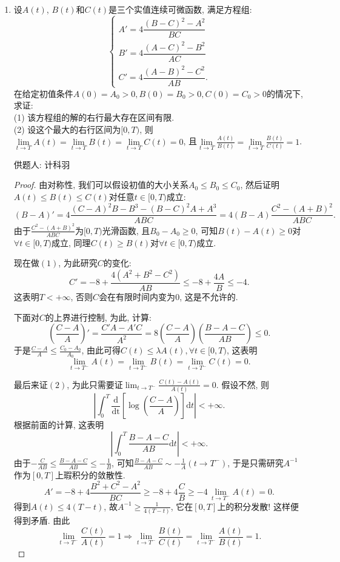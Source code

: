 \documentclass[lang=cn,12pt,a4paper]{elegantpaper.cls}
\begin{document}
\begin{enumerate}
\begin{proof}
		
		
	\end{proof}
	
	\item 
设$A(t)$, $B(t)$和$C(t)$是三个实值连续可微函数, 满足方程组:
$$
\begin{cases}
	A'=4\dfrac{(B-C)^2-A^2}{BC}\\
	B'=4\dfrac{(A-C)^2-B^2}{AC}\\
	C'=4\dfrac{(A-B)^2-C^2}{AB}.
\end{cases}
$$
在给定初值条件$A(0)=A_0>0, B(0)=B_0>0, C(0)=C_0>0$的情况下, 求证:\\
(1) 该方程组的解的右行最大存在区间有限.\\
(2) 设这个最大的右行区间为$[0,T)$, 则$\lim\limits_{t\to T}A(t)=\lim\limits_{t\to T}B(t)=\lim\limits_{t\to T}C(t)=0$, 且$\lim\limits_{t\to T}\frac{A(t)}{B(t)}=\lim\limits_{t\to T}\frac{B(t)}{C(t)}=1$.
\begin{flushright}
	\kaishu
	供题人: 计科羽
\end{flushright}
\begin{proof}
由对称性, 我们可以假设初值的大小关系$A_0\leq B_0\leq C_0$, 然后证明$A(t)\leq B(t)\leq C(t)$对任意$t\in [0,T)$成立:
\[(B-A)'=4\frac{(C-A)^2B-B^3-(B-C)^2A+A^3}{ABC}=4(B-A)\frac{C^2-(A+B)^2}{ABC}.\]
由于$\frac{C^2-(A+B)^2}{ABC}$为$[0,T)$光滑函数, 且$B_0-A_0\geq 0$, 可知$B(t)-A(t)\geq 0$对$\forall t\in[0,T)$成立, 同理$C(t)\geq B(t)$对$\forall t\in[0,T)$成立.

现在做$(1)$, 为此研究$C$的变化: 
\[C'=-8+\frac{4(A^2+B^2-C^2)}{AB}\leq -8+\frac{4A}{B}\leq -4.\]
这表明$T<+\infty$, 否则$C$会在有限时间内变为$0$, 这是不允许的.

下面对$C$的上界进行控制, 为此, 计算:
\[\left(\frac{C-A}{A}\right)'=\frac{C'A-A'C}{A^2}=8\left(\frac{C-A}{A}\right)\left(\frac{B-A-C}{AB}\right)\leq 0.\]
于是$\frac{C-A}{A}\leq \frac{C_0-A_0}{A_0}$, 由此可得$C(t)\leq \lambda A(t),\forall t\in [0,T)$, 这表明
\[\lim_{t\rightarrow T^- }A(t)=\lim_{t\rightarrow T^- }B(t)=\lim_{t\rightarrow T^- }C(t)=0.\]

最后来证$(2)$, 为此只需要证$\displaystyle\lim_{t\rightarrow T^-}\frac{C(t)-A(t)}{A(t)}=0$. 假设不然, 则\[\left|\int_{0}^T\frac{\mathrm{d}}{\mathrm{dt}}\left[\log\left(\frac{C-A}{A}\right)\right] \mathrm{d}t\right|<+\infty.\]
根据前面的计算, 这表明
\[\left|\int_0^T\frac{B-A-C}{AB}\mathrm{d}t\right|<+\infty.\]
由于$-\frac{C}{AB}\leq \frac{B-A-C}{AB}\leq -\frac{1}{B}$, 可知$\frac{B-A-C}{AB}\sim -\frac{1}{A}(t\rightarrow T^-)$, 于是只需研究$A^{-1}$作为$[0,T]$上瑕积分的敛散性.
\[A'=-8+4\frac{B^2+C^2-A^2}{BC}\geq -8+4\frac{C}{B}\geq -4\,\lim_{t\rightarrow T^-}A(t)=0.\]
得到$A(t)\leq 4(T-t)$, 故$A^{-1}\geq \frac{1}{4(T-t)}$, 它在$[0,T]$上的积分发散! 这样便得到矛盾. 由此
\[\lim_{t\rightarrow T^-}\frac{C(t)}{A(t)}=1\Rightarrow \lim_{t\rightarrow T^-}\frac{B(t)}{C(t)}=\lim_{t\rightarrow T^-}\frac{A(t)}{B(t)}=1.\]


\end{proof}
\end{enumerate}
\end{document}
